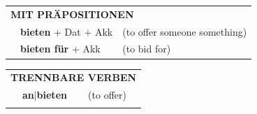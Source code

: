\documentclass[10pt,a4paper]{revtex4-2}
\begin{document}
\begin{verbbox}
\vspace{10pt}

\begin{tabular}{lll}
\multicolumn{3}{l}{\textbf{MIT PRÄPOSITIONEN}}\\
& \textbf{bieten} + Dat + Akk & (to offer someone something)\\
& \textbf{bieten für} + Akk & (to bid for)\\
\end{tabular}
\hfill
\begin{tabular}{lll}
\multicolumn{3}{l}{\textbf{TRENNBARE VERBEN}}\\
& \textbf{an$|$bieten} & (to offer)\\
\vspace{10pt}
\end{tabular}

\vspace{-5pt}
\end{verbbox}
\end{document}
